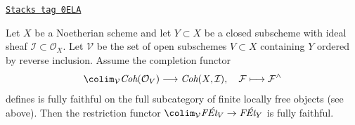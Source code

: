\begin{lemma}
\label{pione-lemma-restriction-fully-faithful-general}
\href{https://stacks.math.columbia.edu/tag/0ELA}{\texttt{Stacks tag 0ELA}}

Let $X$ be a Noetherian scheme and let $Y \subset X$ be a closed subscheme
with ideal sheaf $\mathcal{I} \subset \mathcal{O}_X$.
Let $\mathcal{V}$ be the set of open subschemes $V \subset X$ containing $Y$
ordered by reverse inclusion. Assume the completion functor
$$
\colim_\mathcal{V} \textit{Coh}(\mathcal{O}_V)
\longrightarrow
\textit{Coh}(X, \mathcal{I}),
\quad
\mathcal{F} \longmapsto \mathcal{F}^\wedge
$$
defines is fully faithful on the full subcategory of
finite locally free objects (see above).
Then the restriction functor
$\colim_\mathcal{V} \textit{F\'Et}_V \to \textit{F\'Et}_Y$
is fully faithful.
\end{lemma}

